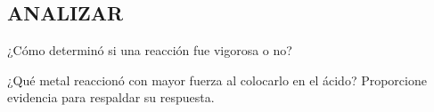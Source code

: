 \documentclass[a4paper,11pt]{exam}
\begin{document}
\subsection*{ANALIZAR}

\begin{questions}



\question ¿Cómo determinó si una reacción fue vigorosa o no?

\fillwithlines{1in}


\question ¿Qué metal reaccionó con mayor fuerza al colocarlo en el ácido? Proporcione evidencia para respaldar su respuesta.

\fillwithlines{1in}

\end{questions}
\end{document}
